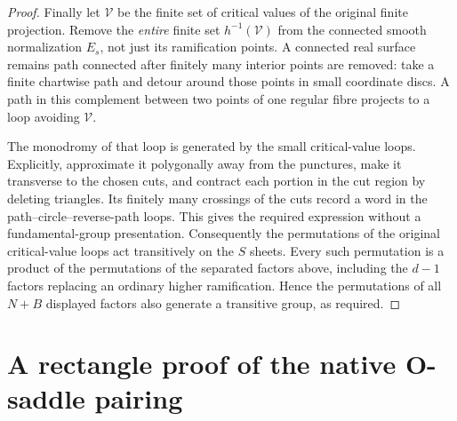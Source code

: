 \documentclass[11pt,a4paper]{article}
\theoremstyle{remark}
\begin{document}
\begin{proof}
Finally let $\mathcal V$ be the finite set of critical values of the
original finite projection.  Remove the \emph{entire} finite set
$h^{-1}(\mathcal V)$ from the connected smooth normalization $E_s$,
not just its ramification points.  A connected real surface remains
path connected after finitely many interior points are removed: take
a finite chartwise path and detour around those points in small
coordinate discs.  A path in this complement between two points of
one regular fibre projects to a loop avoiding $\mathcal V$.

The monodromy of that loop is generated by the small critical-value
loops.  Explicitly, approximate it polygonally away from the punctures,
make it transverse to the chosen cuts, and contract each portion in the
cut region by deleting triangles.  Its finitely many crossings of the
cuts record a word in the path--circle--reverse-path loops.  This gives
the required expression without a fundamental-group presentation.
Consequently the permutations of the original critical-value loops
act transitively on the $S$ sheets.  Every such permutation is a product
of the permutations of the separated factors above, including the
$d-1$ factors replacing an ordinary higher ramification.  Hence the
permutations of all $N+B$ displayed factors also generate a transitive
group, as required.

\end{proof}


\section{A rectangle proof of the native O-saddle pairing}
\end{document}
